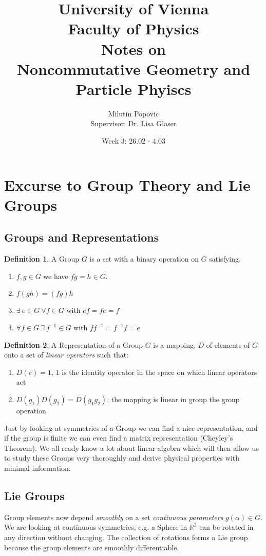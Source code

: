 \documentclass[a4paper]{article}
\title{University of Vienna\\ Faculty of Physics\\ \vspace{1.25cm}
Notes on\\ Noncommutative Geometry and Particle Phyiscs}
\author{Milutin Popovic \\ Supervisor: Dr. Lisa
Glaser}
\date{Week 3: 26.02 - 4.03}
\theoremstyle{definition}
\newtheorem{definition}{Definition}
\theoremstyle{definition}
\theoremstyle{definition}
\theoremstyle{theorem}
\theoremstyle{theorem}
\theoremstyle{theorem}
\theoremstyle{definition}
\begin{document}
    \maketitle
    \tableofcontents
    \newpage
\section{Excurse to Group Theory and Lie Groups}
\subsection{Groups and Representations}
    \begin{definition}
        A Group $G$ is a set with a binary operation on $G$ satisfying.
        \begin{enumerate}
        \item $f, g \in G$ we have $fg = h \in G$.
        \item $f(gh) = (fg) h$
        \item  $\exists\ e \in G\ \forall f\in G$ with $ef=fe=f$
        \item $\forall f \in G\ \exists\ f^{-1}\in G$ with $ff^{-1}=f^{-1}f=e$
        \end{enumerate}
    \end{definition}

    \begin{definition}
        A Representation of a Group $G$ is a mapping, $D$ of elements of $G$ onto a set of \textit{linear
        operators} such that:
        \begin{enumerate}
            \item $D(e) = 1$, $1$ is the identity operator in the space on which linear operators act
            \item $D(g_1)D(g_2) = D(g_1g_2)$, the mapping is linear in group the group operation
        \end{enumerate}
    \end{definition}

    Just by looking at symmetries of a Group we can find a nice representation, and if the group is finite we
    can even find a matrix representation (Cheyley's Theorem). We all ready know a lot about linear algebra
    which will then allow us to study these Groups very thoroughly and derive physical properties with
    minimal information.


\subsection{Lie Groups}
    Group elements now depend \textit{smoothly} on a set \textit{continuous parameters} $g(\alpha) \in G$.
    We are looking at continuous symmetries, e.g. a Sphere in $\mathbb{R}^3$ can be rotated in any direction
    without changing. The collection of rotations forms a Lie group because the group elements are smoothly
    differentiable.
\end{document}
